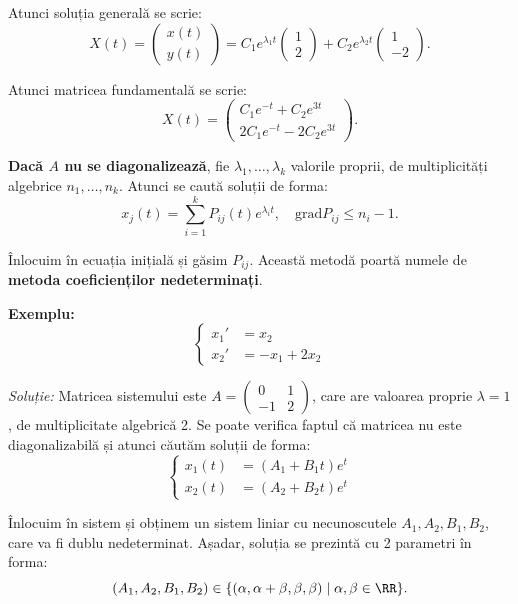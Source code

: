 Atunci soluția generală se scrie:
\[
  X(t) = \begin{pmatrix} x(t) \\ y(t) \end{pmatrix} = %
  C_1 e^{\lambda_1 t} \begin{pmatrix} 1 \\ 2 \end{pmatrix} + %
  C_2 e^{\lambda_2 t} \begin{pmatrix} 1 \\ -2 \end{pmatrix}.
\]

Atunci matricea fundamentală se scrie:
\[
  X(t) = \begin{pmatrix}
    C_1 e^{-t} + C_2 e^{3t} \\
    2C_1 e^{-t} - 2C_2 e^{3t}
  \end{pmatrix}.
\]

\vspace{0.5cm}

\textbf{Dacă $A$ nu se diagonalizează}, fie $\lambda_1, \dots, \lambda_k$ valorile proprii,
de multiplicități algebrice $n_1, \dots, n_k$. Atunci se caută soluții de forma:
\[
  x_j(t) = \sum_{i = 1}^k P_{ij}(t) e^{\lambda_i t}, \quad \mathrm{grad}P_{ij} \leq n_i - 1.
\]

Înlocuim în ecuația inițială și găsim $P_{ij}$. Această metodă poartă numele de
\textbf{metoda coeficienților nedeterminați}.

\vspace{0.5cm}

\textbf{Exemplu:}
\[
  \begin{cases}
    x_1' &= x_2 \\
    x_2' &= -x_1 + 2x_2
  \end{cases}
\]

\emph{Soluție:} Matricea sistemului este $A = \begin{pmatrix} 0 & 1 \\ -1 & 2 \end{pmatrix}$,
care are valoarea proprie $\lambda = 1$, de multiplicitate algebrică 2. Se poate verifica faptul
că matricea nu este diagonalizabilă și atunci căutăm soluții de forma:
\[
  \begin{cases}
    x_1(t) &= (A_1 + B_1 t) e^t \\
    x_2(t) &= (A_2 + B_2 t) e^t
  \end{cases}
\]

Înlocuim în sistem și obținem un sistem liniar cu necunoscutele $A_1, A_2, B_1, B_2$,
care va fi dublu nedeterminat. Așadar, soluția se prezintă cu 2 parametri în forma:
\[
  (A_1, A_2, B_1, B_2) \in \{ (\alpha, \alpha + \beta, \beta, \beta) \mid \alpha, \beta \in \RR \}.
\]

